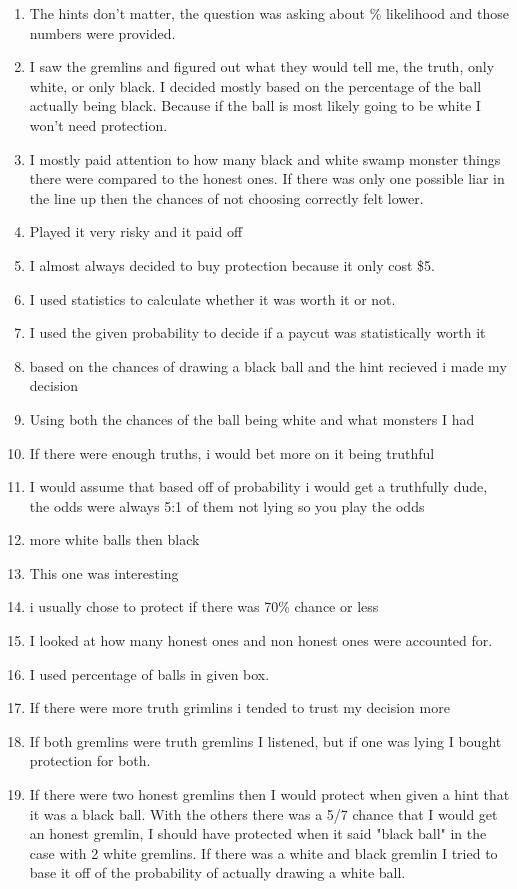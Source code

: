 \documentclass[12pt,a4paper]{article}
\begin{document}
\begin{appendices}
\begin{enumerate}
\item The hints don't matter, the question was asking about \% likelihood and those numbers were provided.
\item I saw the gremlins and figured out what they would tell me, the truth, only white, or only black. I decided mostly based on the percentage of the ball actually being black. Because if the ball is most likely going to be white I won't need protection.
\item I mostly paid attention to how many black and white swamp monster things there were compared to the honest ones. If there was only one possible liar in the line up then the chances of not choosing correctly felt lower. 
\item Played it very risky and it paid off
\item I almost always decided to buy protection because it only cost \$5. 
\item I used statistics to calculate whether it was worth it or not. 
\item I used the given probability to decide if a paycut was statistically worth it
\item based on the chances of drawing a black ball and the hint recieved i made my decision
\item Using both the chances of the ball being white and what monsters I had 
\item If there were enough truths, i would bet more on it being truthful
\item I would assume that based off of probability i would get a truthfully dude, the odds were always 5:1 of them not lying so you play the odds
\item more white balls then black
\item This one was interesting
\item i usually chose to protect if there was 70\% chance or less
\item I looked at how many honest ones and non honest ones were accounted for.
\item I used percentage of balls in given box.
\item If there were more truth grimlins i tended to trust my decision more
\item If both gremlins were truth gremlins I listened, but if one was lying I bought protection for both.
\item If there were two honest gremlins then I would protect when given a hint that it was a black ball. With the others there was a 5/7 chance that I would get an honest gremlin, I should have protected when it said "black ball" in the case with 2 white gremlins. If there was a white and black gremlin I tried to base it off of the probability of actually drawing a white ball. 

\end{enumerate}
\end{appendices}
\end{document}

